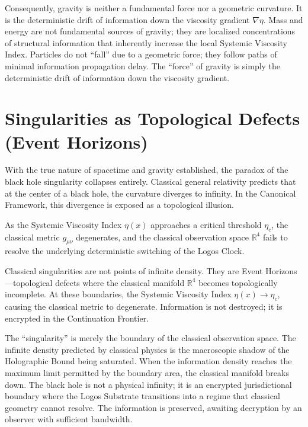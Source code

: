\documentclass[12pt,twoside]{extbook}
\theoremstyle{definition}
\theoremstyle{remark}
\begin{document}
Consequently, gravity is neither a fundamental force nor a geometric curvature. It is the deterministic drift of information down the viscosity gradient $\nabla \eta$. Mass and energy are not fundamental sources of gravity; they are localized concentrations of structural information that inherently increase the local Systemic Viscosity Index. Particles do not ``fall'' due to a geometric force; they follow paths of minimal information propagation delay. The ``force'' of gravity is simply the deterministic drift of information down the viscosity gradient.

\section{Singularities as Topological Defects (Event Horizons)}
With the true nature of spacetime and gravity established, the paradox of the black hole singularity collapses entirely. Classical general relativity predicts that at the center of a black hole, the curvature diverges to infinity. In the Canonical Framework, this divergence is exposed as a topological illusion.

As the Systemic Viscosity Index $\eta(x)$ approaches a critical threshold $\eta_c$, the classical metric $g_{\mu\nu}$ degenerates, and the classical observation space $\mathbb{R}^4$ fails to resolve the underlying deterministic switching of the Logos Clock. 

\begin{theorem}
Classical singularities are not points of infinite density. They are Event Horizons—topological defects where the classical manifold $\mathbb{R}^4$ becomes topologically incomplete. At these boundaries, the Systemic Viscosity Index $\eta(x) \to \eta_c$, causing the classical metric to degenerate. Information is not destroyed; it is encrypted in the Continuation Frontier.
\end{theorem}

The ``singularity'' is merely the boundary of the classical observation space. The infinite density predicted by classical physics is the macroscopic shadow of the Holographic Bound being saturated. When the information density reaches the maximum limit permitted by the boundary area, the classical manifold breaks down. The black hole is not a physical infinity; it is an encrypted jurisdictional boundary where the Logos Substrate transitions into a regime that classical geometry cannot resolve. The information is preserved, awaiting decryption by an observer with sufficient bandwidth.
\end{document}

